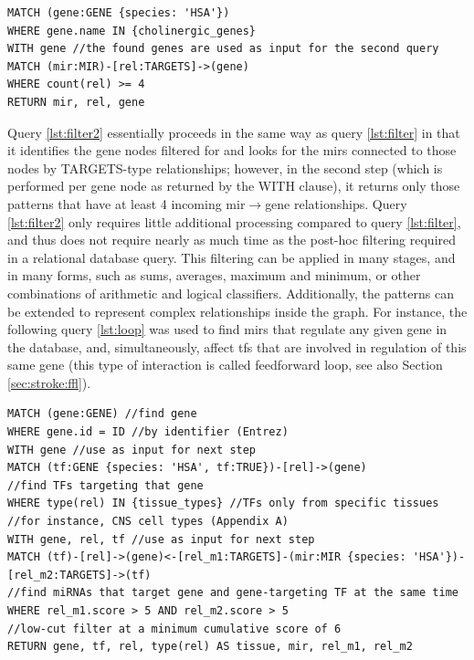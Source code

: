\begin{lstlisting}[label=lst:filter2,caption=Two-stage Filtering,
language=Cypher]
MATCH (gene:GENE {species: 'HSA'})
WHERE gene.name IN {cholinergic_genes}
WITH gene //the found genes are used as input for the second query
MATCH (mir:MIR)-[rel:TARGETS]->(gene)
WHERE count(rel) >= 4
RETURN mir, rel, gene
\end{lstlisting}

Query \ref{lst:filter2} essentially proceeds in the same way as query \ref{lst:filter} in that it identifies the gene nodes filtered for and looks for the \acp{mir} connected to those nodes by TARGETS-type relationships; however, in the second step (which is performed per gene node as returned by the \textcolor{dkblue}{WITH} clause), it returns only those patterns that have at least 4 incoming \ac{mir}$\to$gene relationships. Query \ref{lst:filter2} only requires little additional processing compared to query \ref{lst:filter}, and thus does not require nearly as much time as the post-hoc filtering required in a relational database query. This filtering can be applied in many stages, and in many forms, such as sums, averages, maximum and minimum, or other combinations of arithmetic and logical classifiers. Additionally, the patterns can be extended to represent complex relationships inside the graph. For instance, the following query \ref{lst:loop} was used to find \acp{mir} that regulate any given gene in the database, and, simultaneously, affect \acp{tf} that are involved in regulation of this same gene (this type of interaction is called feedforward loop, see also Section \ref{sec:stroke:ffl}).

\begin{lstlisting}[label=lst:loop,
caption=Feedforward Loop Identification,
language=Cypher]
MATCH (gene:GENE) //find gene
WHERE gene.id = ID //by identifier (Entrez)
WITH gene //use as input for next step
MATCH (tf:GENE {species: 'HSA', tf:TRUE})-[rel]->(gene) 
//find TFs targeting that gene
WHERE type(rel) IN {tissue_types} //TFs only from specific tissues
//for instance, CNS cell types (Appendix A)
WITH gene, rel, tf //use as input for next step
MATCH (tf)-[rel]->(gene)<-[rel_m1:TARGETS]-(mir:MIR {species: 'HSA'})-[rel_m2:TARGETS]->(tf) 
//find miRNAs that target gene and gene-targeting TF at the same time
WHERE rel_m1.score > 5 AND rel_m2.score > 5 
//low-cut filter at a minimum cumulative score of 6
RETURN gene, tf, rel, type(rel) AS tissue, mir, rel_m1, rel_m2
\end{lstlisting}

